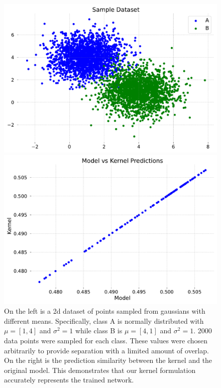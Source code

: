     \begin{figure}
        \centering
        \begin{minipage}{0.45\textwidth}
            \centering
            \includegraphics[width=0.95\linewidth]{c3_figures/sample_dataset.pdf}
        \end{minipage}
        \begin{minipage}{0.45\textwidth}
            \centering
            \includegraphics[width=0.95\linewidth]{c3_figures/model_kernel_predictions.pdf}
        \end{minipage}
        \caption{On the left is a 2d dataset of points sampled from gaussians with different means. Specifically, class A is normally distributed with $\mu = \left[1, 4\right]$ and $\sigma^2 = 1$ while class B is $\mu = \left[4, 1\right]$ and $\sigma^2 = 1$. 2000 data points were sampled for each class. These values were chosen arbitrarily to provide separation with a limited amount of overlap. On the right is the prediction similarity between the kernel and the original model. This demonstrates that our kernel formulation accurately represents the trained network.}
        \label{fig:sample_data}
    \end{figure}

